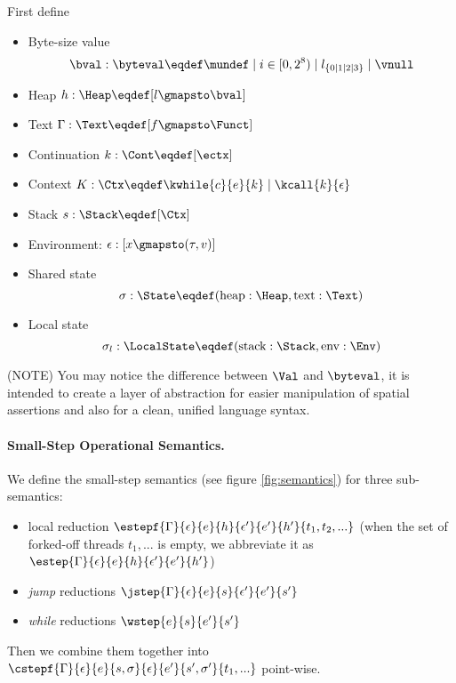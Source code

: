First define
\begin{itemize}
\item Byte-size value \[\bval : \byteval \eqdef \mundef \mid i \in [0, 2^8) \mid l_{\{0 \mid 1 \mid 2 \mid 3\}} \mid \vnull\]
\item Heap $h: \Heap \eqdef [ l \gmapsto \bval ]$
\item Text $\Gamma: \Text \eqdef [ f \gmapsto \Funct ]$
\item Continuation $k: \Cont \eqdef [\ectx]$
\item Context $K: \Ctx \eqdef \kwhile{c}{e}{k} \mid \kcall{k}{\epsilon}$
\item Stack $s: \Stack \eqdef [\Ctx]$
\item Environment: $ \epsilon : [x \gmapsto (\tau, v)]$
\item Shared state \[\sigma: \State \eqdef (\text{heap}: \Heap, \text{text}: \Text)\]
\item Local state \[\sigma_l: \LocalState \eqdef (\text{stack}: \Stack, \text{env}: \Env)\]
\end{itemize}

(NOTE) You may notice the difference between $\Val$ and $\byteval$, it is intended to create a layer of abstraction for
easier manipulation of spatial assertions and also for a clean, unified language syntax.

\paragraph{Small-Step Operational Semantics.}

We define the small-step semantics (see figure \ref{fig:semantics}) for three sub-semantics:

\begin{itemize}
    \item local reduction $\estepf{\Gamma}{\epsilon}{e}{h}{\epsilon'}{e'}{h'}{t_1, t_2, ...}$
          (when the set of forked-off threads $t_1, ...$ is empty, we abbreviate it as
          $\estep{\Gamma}{\epsilon}{e}{h}{\epsilon'}{e'}{h'}$)
    \item \emph{jump} reductions $\jstep{\Gamma}{\epsilon}{e}{s}{\epsilon'}{e'}{s'}$
    \item \emph{while} reductions $\wstep{e}{s}{e'}{s'}$
\end{itemize}

Then we combine them together into $\cstepf{\Gamma}{\epsilon}{e}{s, \sigma}{\epsilon}{e'}{s', \sigma'}{t_1, ...}$ point-wise.

